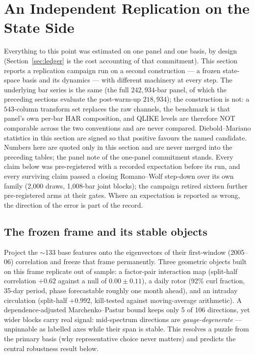 \section{An Independent Replication on the State Side}
\label{sec:replication}

Everything to this point was estimated on one panel and one basis, by design
(Section~\ref{sec:ledger} is the cost accounting of that commitment). This
section reports a replication campaign run on a second construction --- a
frozen state-space basis and its dynamics --- with different machinery at every
step. The underlying bar series is the same (the full $242{,}934$-bar panel,
of which the preceding sections evaluate the post-warm-up $218{,}934$); the
construction is not: a $543$-column transform set replaces the raw channels,
the benchmark is that panel's own per-bar HAR composition, and QLIKE levels
are therefore NOT comparable across the two conventions and are never
compared. Diebold--Mariano statistics in this section are signed so that
positive favours the named candidate. Numbers here are quoted only in this
section and are never merged into the preceding tables; the panel note of the
one-panel commitment stands. Every
claim below was pre-registered with a recorded expectation before its run, and
every surviving claim passed a closing Romano--Wolf step-down over its own
family (2{,}000 draws, 1{,}008-bar joint blocks); the campaign retired sixteen
further pre-registered arms at their gates. Where an expectation is reported as
wrong, the direction of the error is part of the record.

\subsection{The frozen frame and its stable objects}
\label{sec:frozen-frame}

Project the $\sim$133 base features onto the eigenvectors of their
first-window (2005--06) correlation and freeze that frame permanently. Three
geometric objects built on this frame replicate out of sample: a factor-pair
interaction map (split-half correlation $+0.62$ against a null of
$0.00 \pm 0.11$), a daily rotor (92\% curl fraction, 35-day period, phase
forecastable roughly one month ahead), and an intraday circulation (split-half
$+0.992$, kill-tested against moving-average arithmetic). A
dependence-adjusted Marchenko--Pastur bound keeps only 5 of 106 directions,
yet wider blocks carry real signal: mid-spectrum directions are
\emph{gauge-degenerate} --- unpinnable as labelled axes while their span is
stable. This resolves a puzzle from the primary basis (why representative
choice never matters) and predicts the central robustness result below.

